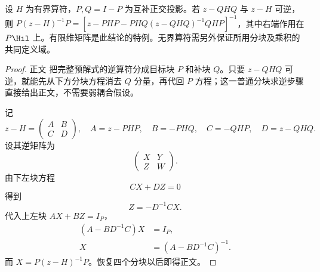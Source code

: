 \begin{lemma}
设 $H$ 为有界算符，$P,Q=I-P$ 为互补正交投影。若 $z-QHQ$ 与 $z-H$ 可逆，则 $P(z-H)^{-1}P=[z-PHP-PHQ(z-QHQ)^{-1}QHP]^{-1}$，其中右端作用在 $P\Hil$ 上。有限维矩阵是此结论的特例。无界算符需另外保证所用分块及乘积的共同定义域。
\end{lemma}
\begin{proof}
正文 把完整预解式的逆算符分成目标块 $P$ 和补块 $Q$。只要 $z-QHQ$ 可逆，就能先从下方分块方程消去 $Q$ 分量，再代回 $P$ 方程；这一普通分块求逆步骤直接给出正文，不需要弱耦合假设。

记
\begin{equation*}
 z-H=
 \begin{pmatrix}A&B\\C&D\end{pmatrix},
 \quad
 A=z-PHP,
 \quad B=-PHQ,
 \quad C=-QHP,
 \quad D=z-QHQ.
\end{equation*}
设其逆矩阵为
\begin{equation*}
 \begin{pmatrix}X&Y\\Z&W\end{pmatrix}.
\end{equation*}
由下左块方程
\begin{equation*}
 CX+DZ=0
\end{equation*}
得到
\begin{equation*}
 Z=-D^{-1}CX.
\end{equation*}
代入上左块 $AX+BZ=I_P$，
\begin{align*}
 (A-BD^{-1}C)X&=I_P,\\
 X&=(A-BD^{-1}C)^{-1}.
\end{align*}
而 $X=P(z-H)^{-1}P$。恢复四个分块以后即得正文。
\end{proof}

